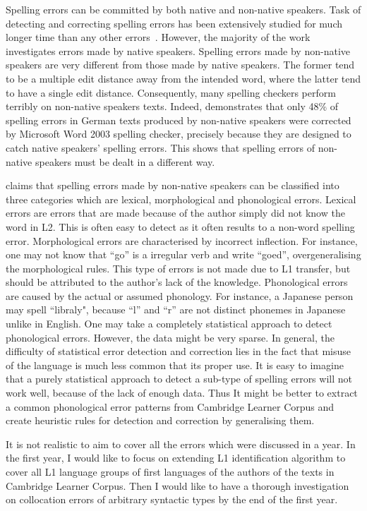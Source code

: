 \documentclass[11pt]{article}
\begin{document}
Spelling errors can be committed by both native and non-native speakers. Task of detecting and correcting spelling errors has been extensively studied for much longer time than any other errors~\citep{heift2007errors}. However, the majority of the work investigates errors made by native speakers. Spelling errors made by non-native speakers are very different from those made by native speakers. The former tend to be a multiple edit distance away from the intended word, where the latter tend to have a single edit distance. Consequently, many spelling checkers perform terribly on non-native speakers texts. Indeed, \cite{rimrott2005language} demonstrates that only 48\% of spelling errors in German texts produced by non-native speakers were corrected by Microsoft Word 2003 spelling checker, precisely because they are designed to catch native speakers' spelling errors. This shows that spelling errors of non-native speakers must be dealt in a different way. 

\cite{rimrott2008evaluating} claims that spelling errors made by non-native speakers can be classified into three categories which are lexical, morphological and phonological errors. Lexical errors are errors that are made because of the author simply did not know the word in L2. This is often easy to detect as it often results to a non-word spelling error. Morphological errors are characterised by incorrect inflection. For instance, one may not know that ``go'' is a irregular verb and write ``goed'', overgeneralising the morphological rules. This type of errors is not made due to L1 transfer, but should be attributed to the author's lack of the knowledge. Phonological errors are caused by the actual or assumed phonology. For instance, a Japanese person may spell ``libraly", because ``l'' and ``r'' are not distinct phonemes in Japanese unlike in English. One may take a completely statistical approach to detect phonological errors. However, the data might be very sparse. In general, the difficulty of statistical error detection and correction lies in the fact that misuse of the language is much less common that its proper use. It is easy to imagine that a purely statistical approach to detect a sub-type of spelling errors will not work well, because of the lack of enough data. Thus It might be better to extract a common phonological error patterns from Cambridge Learner Corpus and create heuristic rules for detection and correction by generalising them.

It is not realistic to aim to cover all the errors which were discussed in a year. In the first year, I would like to focus on extending L1 identification algorithm to cover all L1 language groups of first languages of the authors of the texts in Cambridge Learner Corpus. Then I would like to have a thorough investigation on collocation errors of arbitrary syntactic types by the end of the first year.
\end{document}
